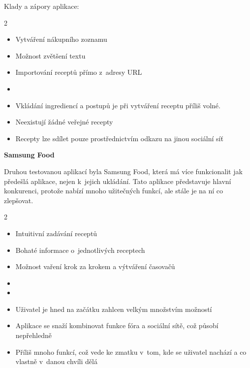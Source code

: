 \documentclass[a4paper, 11pt]{article}
\newcommand{\plus}{\textbf{\color{ForestGreen}+}}
\renewcommand{\minus}{\textbf{\color{Red}-}}
\begin{document}
    Klady a zápory aplikace:
    \begin{multicols}{2}
    \begin{itemize}
        \item[\textbf{\plus}] Vytváření nákupního zoznamu %
        \item[\textbf{\plus}] Možnost zvětšení textu
        \item[\textbf{\plus}] Importování receptů přímo z~adresy URL
        \item[]
        \item[\textbf{\minus}] Vkládání ingrediencí a postupů je při vytváření receptu příliš volné.
        \item[\textbf{\minus}] Neexistují žádné veřejné recepty
        \item[\textbf{\minus}] Recepty lze sdílet pouze prostřednictvím odkazu na jinou sociální síť
    \end{itemize}
    \end{multicols}

    \noindent\textbf{Samsung Food}

    Druhou testovanou aplikací byla Samsung Food, která má více funkcionalit jak předešlá aplikace, 
    nejen k~jejich ukládání. Tato aplikace představuje hlavní konkurenci, protože nabízí mnoho užitečných 
    funkcí, ale stále je na ní co zlepšovat.

    \begin{multicols}{2}
    \begin{itemize}
        \item[\textbf{\plus}] Intuitivní zadávání receptů
        \item[\textbf{\plus}] Bohaté informace o~jednotlivých receptech
        \item[\textbf{\plus}] Možnost vaření krok za krokem a výtváření časovačů
        \item[ ]
        \item[ ]
        \item[\textbf{\minus}] Uživatel je hned na začátku zahlcen velkým množstvím možností
        \item[\textbf{\minus}] Aplikace se snaží kombinovat funkce fóra a sociální sítě, což působí nepřehledně
        \item[\textbf{\minus}] Příliš mnoho funkcí, což vede ke zmatku v~tom, kde se uživatel nachází
        a co vlastně v~danou chvíli dělá
    \end{itemize}
    \end{multicols}
\end{document}
